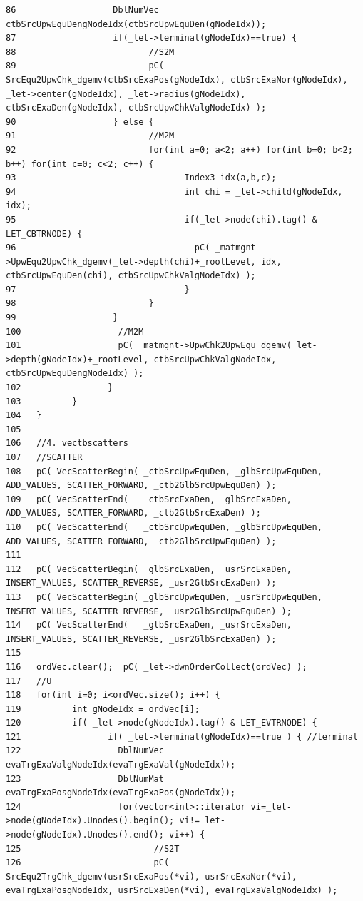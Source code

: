 \begin{verbatim}
86                   DblNumVec ctbSrcUpwEquDengNodeIdx(ctbSrcUpwEquDen(gNodeIdx));
87                   if(_let->terminal(gNodeIdx)==true) {
88                          //S2M
89                          pC( SrcEqu2UpwChk_dgemv(ctbSrcExaPos(gNodeIdx), ctbSrcExaNor(gNodeIdx), _let->center(gNodeIdx), _let->radius(gNodeIdx), ctbSrcExaDen(gNodeIdx), ctbSrcUpwChkValgNodeIdx) );
90                   } else {
91                          //M2M
92                          for(int a=0; a<2; a++) for(int b=0; b<2; b++) for(int c=0; c<2; c++) {
93                                 Index3 idx(a,b,c);
94                                 int chi = _let->child(gNodeIdx, idx);
95                                 if(_let->node(chi).tag() & LET_CBTRNODE) {
96                                   pC( _matmgnt->UpwEqu2UpwChk_dgemv(_let->depth(chi)+_rootLevel, idx, ctbSrcUpwEquDen(chi), ctbSrcUpwChkValgNodeIdx) );
97                                 }
98                          }
99                   }
100                   //M2M
101                   pC( _matmgnt->UpwChk2UpwEqu_dgemv(_let->depth(gNodeIdx)+_rootLevel, ctbSrcUpwChkValgNodeIdx, ctbSrcUpwEquDengNodeIdx) );
102                 }
103          }
104   }
105   
106   //4. vectbscatters
107   //SCATTER
108   pC( VecScatterBegin( _ctbSrcUpwEquDen, _glbSrcUpwEquDen,    ADD_VALUES, SCATTER_FORWARD, _ctb2GlbSrcUpwEquDen) );
109   pC( VecScatterEnd(   _ctbSrcExaDen, _glbSrcExaDen,    ADD_VALUES, SCATTER_FORWARD, _ctb2GlbSrcExaDen) );
110   pC( VecScatterEnd(   _ctbSrcUpwEquDen, _glbSrcUpwEquDen,    ADD_VALUES, SCATTER_FORWARD, _ctb2GlbSrcUpwEquDen) );
111   
112   pC( VecScatterBegin( _glbSrcExaDen, _usrSrcExaDen, INSERT_VALUES, SCATTER_REVERSE, _usr2GlbSrcExaDen) );
113   pC( VecScatterBegin( _glbSrcUpwEquDen, _usrSrcUpwEquDen, INSERT_VALUES, SCATTER_REVERSE, _usr2GlbSrcUpwEquDen) );
114   pC( VecScatterEnd(   _glbSrcExaDen, _usrSrcExaDen, INSERT_VALUES, SCATTER_REVERSE, _usr2GlbSrcExaDen) );
115   
116   ordVec.clear();  pC( _let->dwnOrderCollect(ordVec) );
117   //U
118   for(int i=0; i<ordVec.size(); i++) {
119          int gNodeIdx = ordVec[i];
120          if( _let->node(gNodeIdx).tag() & LET_EVTRNODE) {
121                 if( _let->terminal(gNodeIdx)==true ) { //terminal
122                   DblNumVec evaTrgExaValgNodeIdx(evaTrgExaVal(gNodeIdx));
123                   DblNumMat evaTrgExaPosgNodeIdx(evaTrgExaPos(gNodeIdx));
124                   for(vector<int>::iterator vi=_let->node(gNodeIdx).Unodes().begin(); vi!=_let->node(gNodeIdx).Unodes().end(); vi++) {
125                          //S2T
126                          pC( SrcEqu2TrgChk_dgemv(usrSrcExaPos(*vi), usrSrcExaNor(*vi), evaTrgExaPosgNodeIdx, usrSrcExaDen(*vi), evaTrgExaValgNodeIdx) );

\end{verbatim}
